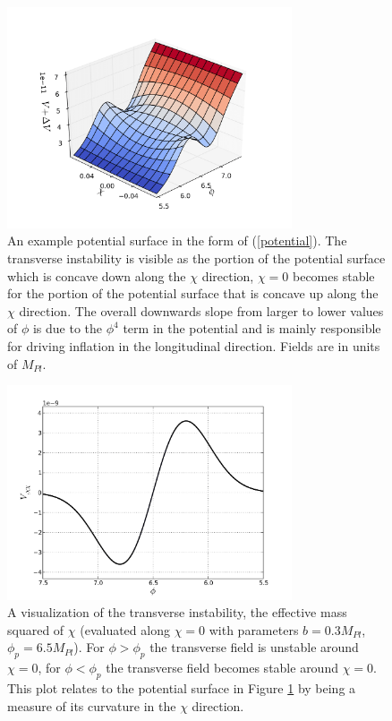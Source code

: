 \documentclass[letterpaper,11pt]{article}
\begin{document}
\begin{figure}
\begin{center}
\includegraphics[width=0.75\textwidth]{potential_plot1.png}
\caption{An example potential surface in the form of (\ref{potential}). The transverse instability is visible as the portion of the potential surface which is concave down along the $\chi$ direction, $\chi=0$ becomes stable for the portion of the potential surface that is concave up along the $\chi$ direction. The overall downwards slope from larger to lower values of $\phi$ is due to the $\phi^4$ term in the potential and is mainly responsible for driving inflation in the longitudinal direction. Fields are in units of $M_{Pl}$.}
\label{potential plot}
\end{center}
\end{figure}

\begin{figure}
\begin{center}
\includegraphics[width=0.75\textwidth]{meff2_plot.png}
\caption{A visualization of the transverse instability, the effective mass squared of $\chi$ (evaluated along $\chi=0$ with parameters $b=0.3M_{Pl}$, $\phi_p=6.5M_{Pl}$). For $\phi>\phi_p$ the transverse field is unstable around $\chi=0$, for $\phi<\phi_p$ the transverse field becomes stable around $\chi=0$. This plot relates to the potential surface in Figure \ref{potential plot} by being a measure of its curvature in the $\chi$ direction.}
\label{meff2 plot}
\end{center}
\end{figure}
\end{document}
